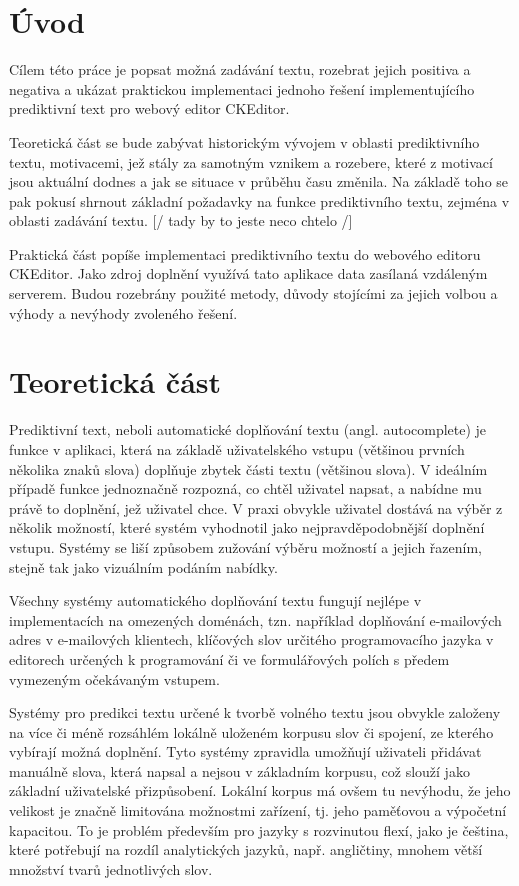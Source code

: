 \documentclass{article}
\begin{document}
\tableofcontents

\section{Úvod}

Cílem této práce je popsat možná zadávání textu, rozebrat jejich positiva a negativa a ukázat praktickou implementaci jednoho řešení implementujícího prediktivní text pro webový editor CKEditor.

Teoretická část se bude zabývat historickým vývojem v oblasti prediktivního textu, motivacemi, jež stály za samotným vznikem a rozebere, které z motivací jsou aktuální dodnes a jak se situace v průběhu času změnila. Na základě toho se pak pokusí shrnout základní požadavky na funkce prediktivního textu, zejména v oblasti zadávání textu. 
[/ tady by to jeste neco chtelo /]

Praktická část popíše implementaci prediktivního textu do webového editoru CKEditor. Jako zdroj doplnění využívá tato aplikace data zasílaná vzdáleným serverem. Budou rozebrány použité metody, důvody stojícími za jejich volbou a výhody a nevýhody zvoleného řešení.

\section{Teoretická část}

Prediktivní text, neboli automatické doplňování textu (angl. autocomplete) je funkce v aplikaci, která na základě uživatelského vstupu (většinou prvních několika znaků slova) doplňuje zbytek části textu (většinou slova). V ideálním případě funkce jednoznačně rozpozná, co chtěl uživatel napsat, a nabídne mu právě to doplnění, jež uživatel chce. V praxi obvykle uživatel dostává na výběr z několik možností, které systém vyhodnotil jako nejpravděpodobnější doplnění vstupu. Systémy se liší způsobem zužování výběru možností a jejich řazením, stejně tak jako vizuálním podáním nabídky.

Všechny systémy automatického doplňování textu fungují nejlépe v implementacích na omezených doménách, tzn. například doplňování e-mailových adres v e-mailových klientech, klíčových slov určitého programovacího jazyka v editorech určených k programování či ve formulářových polích s předem vymezeným očekávaným vstupem. 

Systémy pro predikci textu určené k tvorbě volného textu jsou obvykle založeny na více či méně rozsáhlém lokálně uloženém korpusu slov či spojení, ze kterého vybírají možná doplnění. Tyto systémy zpravidla umožňují uživateli přidávat manuálně slova, která napsal a nejsou v základním korpusu, což slouží jako základní uživatelské přizpůsobení. Lokální korpus má ovšem tu nevýhodu, že jeho velikost je značně limitována možnostmi zařízení, tj. jeho paměťovou a výpočetní kapacitou. To je problém především pro jazyky s rozvinutou flexí, jako je čeština, které potřebují na rozdíl analytických jazyků, např. angličtiny, mnohem větší množství tvarů jednotlivých slov. 
\end{document}
